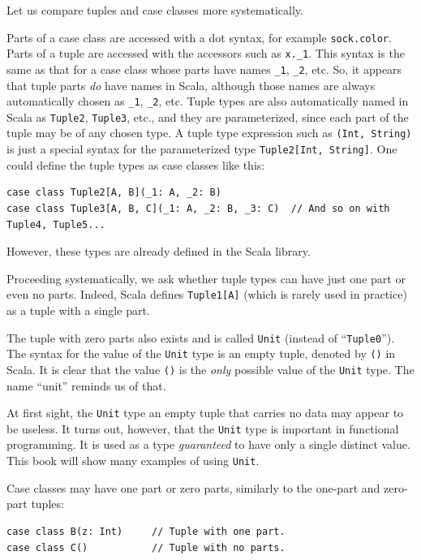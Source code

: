 Let us compare tuples and case classes more systematically.

Parts of a case class are accessed with a dot syntax, for example
\lstinline!sock.color!. Parts of a tuple are accessed with the accessors
such as \lstinline!x._1!. This syntax is the same as that for a case
class whose parts have names \lstinline!_1!, \lstinline!_2!, etc.
So, it appears that tuple parts \emph{do} have names in Scala, although
those names are always automatically chosen as \lstinline!_1!, \lstinline!_2!,
etc. Tuple types are also automatically named in Scala as \lstinline!Tuple2!,
\lstinline!Tuple3!, etc., and they are parameterized, since each
part of the tuple may be of any chosen type. A tuple type expression
such as \lstinline!(Int, String)! is just a special syntax for the
parameterized type \lstinline!Tuple2[Int, String]!. One could define
the tuple types as case classes like this:
\begin{lstlisting}
case class Tuple2[A, B](_1: A, _2: B)
case class Tuple3[A, B, C](_1: A, _2: B, _3: C)  // And so on with Tuple4, Tuple5...
\end{lstlisting}
However, these types are already defined in the Scala library.

Proceeding systematically, we ask whether tuple types can have just
one part or even no parts. Indeed, Scala defines \lstinline!Tuple1[A]!
(which is rarely used in practice) as a tuple with a single part.

The tuple with zero parts also exists and is called \lstinline!Unit!
(instead of \textsf{``}\lstinline!Tuple0!\textsf{''}). The syntax for the value of
the \lstinline!Unit! type is an empty tuple, denoted by \lstinline!()!
in Scala. It is clear that the value \lstinline!()! is the \emph{only}
possible value of the \lstinline!Unit! type. The name \textsf{``}unit\textsf{''}
reminds us of that. 

At first sight, the \lstinline!Unit! type \textemdash{} an empty
tuple that carries no data \textemdash{} may appear to be useless.
It turns out, however, that the \lstinline!Unit! type is important
in functional programming. It is used as a type \emph{guaranteed}
to have only a single distinct value. This book will show many examples
of using \lstinline!Unit!.

Case classes may have one part or zero parts, similarly to the one-part
and zero-part tuples:
\begin{lstlisting}
case class B(z: Int)     // Tuple with one part.
case class C()           // Tuple with no parts.
\end{lstlisting}

